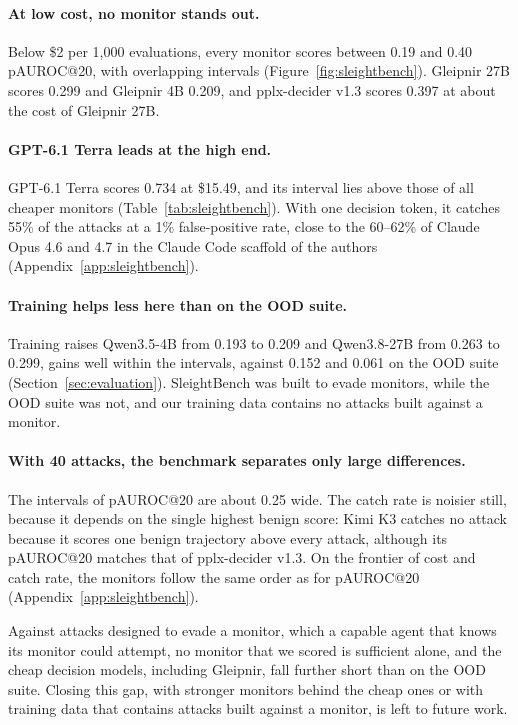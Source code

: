 \paragraph{At low cost, no monitor stands out.}
Below \$2 per 1,000 evaluations, every monitor scores between 0.19 and 0.40 pAUROC@20, with overlapping intervals (Figure~\ref{fig:sleightbench}).
Gleipnir 27B scores 0.299 and Gleipnir 4B 0.209, and pplx-decider v1.3 scores 0.397 at about the cost of Gleipnir 27B.

\paragraph{GPT-6.1 Terra leads at the high end.}
GPT-6.1 Terra scores 0.734 at \$15.49, and its interval lies above those of all cheaper monitors (Table~\ref{tab:sleightbench}).
With one decision token, it catches 55\% of the attacks at a 1\% false-positive rate, close to the 60--62\% of Claude Opus 4.6 and 4.7 in the Claude Code scaffold of the authors (Appendix~\ref{app:sleightbench}).

\paragraph{Training helps less here than on the OOD suite.}
Training raises Qwen3.5-4B from 0.193 to 0.209 and Qwen3.8-27B from 0.263 to 0.299, gains well within the intervals, against 0.152 and 0.061 on the OOD suite (Section~\ref{sec:evaluation}).
SleightBench was built to evade monitors, while the OOD suite was not, and our training data contains no attacks built against a monitor.

\paragraph{With 40 attacks, the benchmark separates only large differences.}
The intervals of pAUROC@20 are about 0.25 wide.
The catch rate is noisier still, because it depends on the single highest benign score: Kimi K3 catches no attack because it scores one benign trajectory above every attack, although its pAUROC@20 matches that of pplx-decider v1.3.
On the frontier of cost and catch rate, the monitors follow the same order as for pAUROC@20 (Appendix~\ref{app:sleightbench}).

Against attacks designed to evade a monitor, which a capable agent that knows its monitor could attempt, no monitor that we scored is sufficient alone, and the cheap decision models, including Gleipnir, fall further short than on the OOD suite.
Closing this gap, with stronger monitors behind the cheap ones or with training data that contains attacks built against a monitor, is left to future work.


